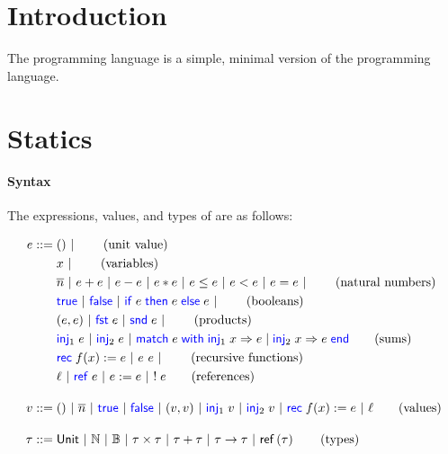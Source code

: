 \documentclass[10pt]{scrartcl}
\begin{document}

\author{Amin Timany}
\title{\miniML{}}

\maketitle

\section{Introduction}
\label{sec:intro}
The programming language \miniML{} is a simple, minimal version of the \ML{} programming language.

\section{Statics}
\label{sec:statics}

\paragraph{Syntax}
The expressions, values, and types of \miniML{} are as follows:

\begin{align*}
  \expr \BNFdef{}
  & \TT \ALT \tag{unit value} \\
  & \var \ALT \tag{variables} \\
  & \Num{n} \ALT \expr + \expr \ALT \expr - \expr \ALT \expr * \expr \ALT \expr \le \expr \ALT \expr < \expr \ALT \expr = \expr \ALT \tag{natural numbers}\\
  & \True \ALT \False \ALT \If \expr then \expr\; \Else \expr \ALT \tag{booleans} \\
  & (\expr, \expr) \ALT \Fst \expr \ALT \Snd \expr \ALT \tag{products} \\
  & \Inj{1} \expr \ALT \Inj{2} \expr \ALT \Match \expr with \Inj{1} \var => \expr | \Inj{2} \var => \expr end \tag{sums}\\
  & \Rec f \var := \expr \ALT \expr~\expr \ALT \tag{recursive functions}\\
  & \loc \ALT \alloc \expr \ALT \expr \store \expr \ALT \deref \expr \tag{references}\\[1em]
  \val \BNFdef{}
  & \TT \ALT \Num{n} \ALT \True \ALT \False \ALT (\val, \val) \ALT \Inj{1} \val \ALT \Inj{2} \val \ALT \Rec f \var := \expr \ALT \loc \tag{values}\\[1em]
  \typ \BNFdef{}
  & \Tunit \ALT \Tnat \ALT \Tbool \ALT \typ \times \typ \ALT \typ + \typ \ALT \typ \to \typ \ALT \Tref{\typ} \tag{types}
\end{align*}
\end{document}
